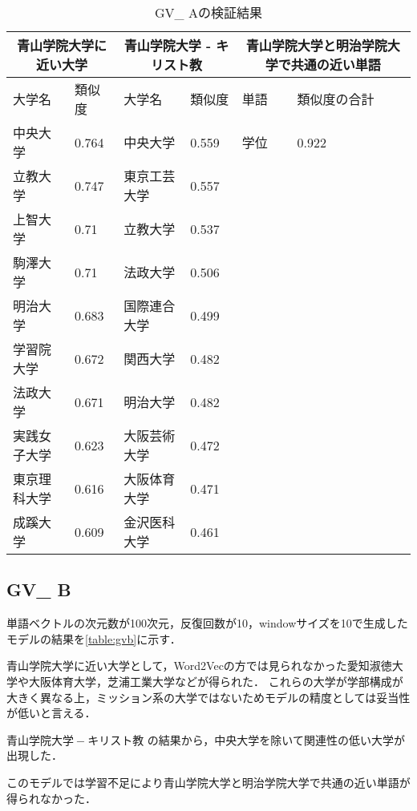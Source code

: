 \begin{table}[H]
\caption{GV\_ Aの検証結果}
\centering
\footnotesize
\begin{tabular}{ll|ll|ll}
\hline
\multicolumn{2}{c}{青山学院大学に近い大学} & \multicolumn{2}{c}{青山学院大学 - キリスト教} & \multicolumn{2}{c}{青山学院大学と明治学院大学で共通の近い単語}
\\ \hline
大学名 & 類似度 & 大学名 & 類似度 & 単語 & 類似度の合計
\\ \hline \hline
中央大学 & 0.764 & 中央大学 & 0.559 & 学位 & 0.922\\
立教大学 & 0.747 & 東京工芸大学 & 0.557 & & \\
上智大学 & 0.71 & 立教大学 & 0.537 & & \\
駒澤大学 & 0.71 & 法政大学 & 0.506 & & \\
明治大学 & 0.683 & 国際連合大学 & 0.499 & & \\
学習院大学 & 0.672 & 関西大学 & 0.482 & & \\
法政大学 & 0.671 & 明治大学 & 0.482 & & \\
実践女子大学 & 0.623 & 大阪芸術大学 & 0.472 & & \\
東京理科大学 & 0.616 & 大阪体育大学 & 0.471 & & \\
成蹊大学 & 0.609 & 金沢医科大学 & 0.461 & & \\ \hline
\end{tabular}
\label{table:gva}
\end{table}


\subsection{GV\_ B}
単語ベクトルの次元数が100次元，反復回数が10，windowサイズを10で生成したモデルの結果を\ref{table:gvb}に示す．

青山学院大学に近い大学として，Word2Vecの方では見られなかった愛知淑徳大学や大阪体育大学，芝浦工業大学などが得られた．
これらの大学が学部構成が大きく異なる上，ミッション系の大学ではないためモデルの精度としては妥当性が低いと言える．

$ 青山学院大学 - キリスト教 $ の結果から，中央大学を除いて関連性の低い大学が出現した．

このモデルでは学習不足により青山学院大学と明治学院大学で共通の近い単語が得られなかった．


